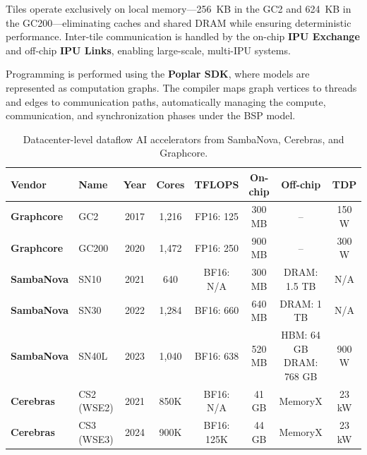 Tiles operate exclusively on local memory—256~KB in the GC2 and 624~KB in the GC200—eliminating caches and shared DRAM while ensuring deterministic performance. Inter-tile communication is handled by the on-chip \textbf{IPU Exchange} and off-chip \textbf{IPU Links}, enabling large-scale, multi-IPU systems.

Programming is performed using the \textbf{Poplar SDK}, where models are represented as computation graphs. The compiler maps graph vertices to threads and edges to communication paths, automatically managing the compute, communication, and synchronization phases under the BSP model.

\begin{table}[h!]
\centering
\footnotesize
\caption{Datacenter-level dataflow AI accelerators from SambaNova, Cerebras, and Graphcore.}
\label{tab:dflow}

\begin{tabularx}{\textwidth}{l l c c c c c c}
\toprule
\textbf{Vendor} & \textbf{Name} & \textbf{Year} & \textbf{Cores} & 
\textbf{TFLOPS} & \textbf{On-chip} & \textbf{Off-chip} & \textbf{TDP} \\
\midrule

\textbf{Graphcore}
& GC2   & 2017 & 1,216 & FP16: 125 
& 300 MB 
& -- 
& 150 W \\

\textbf{Graphcore}
& GC200 & 2020 & 1,472 & FP16: 250 
& 900 MB 
& -- 
& 300 W \\

\midrule

\textbf{SambaNova}
& SN10  & 2021 & 640 
& BF16: N/A 
& 300 MB 
& DRAM: 1.5 TB 
& N/A \\

\textbf{SambaNova}
& SN30  & 2022 & 1,284 
& BF16: 660 
& 640 MB 
& DRAM: 1 TB 
& N/A \\

\textbf{SambaNova}
& SN40L & 2023 & 1,040 
& BF16: 638 
& 520 MB 
& \makecell[l]{HBM: 64 GB \\ DRAM: 768 GB} 
& 900 W \\

\midrule

\textbf{Cerebras}
& CS2 (WSE2) & 2021 & 850K 
& BF16: N/A 
& 41 GB 
& MemoryX 
& 23 kW \\

\textbf{Cerebras}
& CS3 (WSE3) & 2024 & 900K 
& BF16: 125K 
& 44 GB 
& MemoryX 
& 23 kW \\

\bottomrule
\end{tabularx}
\end{table}